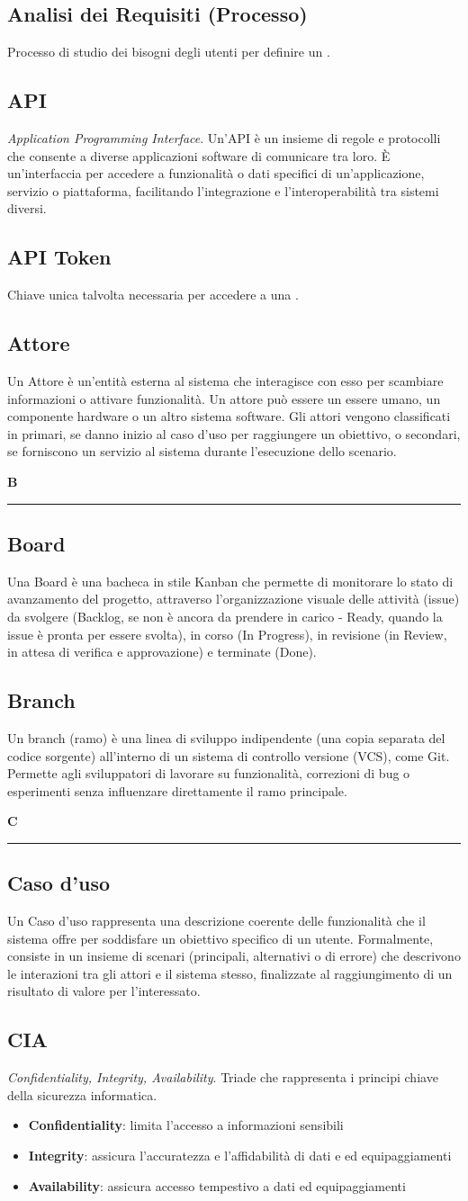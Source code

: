 \documentclass[a4paper, 11pt]{article}
\newcommand{\GlossarioLettera}[1]{%
    \clearpage
    \begin{center}
        {\LARGE \sffamily \color{AccentColor}\bfseries #1}
    \end{center}
    \addcontentsline{toc}{section}{#1}
    \textcolor{AccentColor}{\rule{\textwidth}{0.4pt}}
}
\newcommand{\nocontentsline}[3]{}
\newcommand{\term}[1]{\vspace*{.5cm}\bgroup\let\addcontentsline=\nocontentsline\subsection{#1}\label{term:#1}\egroup}
\newcommand{\refterm}[1]{\nameref{term:#1}}
\begin{document}
\term{Analisi dei Requisiti (Processo)}
Processo di studio dei bisogni degli utenti per definire un \refterm{Requisito}.

\term{API}
\textit{Application Programming Interface}. Un'API è un insieme di regole e protocolli che consente a diverse applicazioni software di comunicare tra loro. È un'interfaccia per accedere a funzionalità o dati specifici di un'applicazione, servizio o piattaforma, facilitando l'integrazione e l'interoperabilità tra sistemi diversi.

\term{API Token}
Chiave unica talvolta necessaria per accedere a una \refterm{API}.

\term{Attore}
Un Attore è un'entità esterna al sistema che interagisce con esso per scambiare informazioni o attivare funzionalità. Un attore può essere un essere umano, un componente hardware o un altro sistema software. Gli attori vengono classificati in primari, se danno inizio al caso d'uso per raggiungere un obiettivo, o secondari, se forniscono un servizio al sistema durante l'esecuzione dello scenario.


\GlossarioLettera{B}
\term{Board}
Una Board è una bacheca in stile Kanban che permette di monitorare lo stato di avanzamento del progetto, attraverso l'organizzazione visuale delle attività (issue) da svolgere (Backlog, se non è ancora da prendere in carico - Ready, quando la issue è pronta per essere svolta), in corso (In Progress), in revisione (in Review, in attesa di verifica e approvazione) e terminate (Done).

\term{Branch}
Un branch (ramo) è una linea di sviluppo indipendente (una copia separata del codice sorgente) all'interno di un sistema di controllo versione (VCS), come Git. Permette agli sviluppatori di lavorare su funzionalità, correzioni di bug o esperimenti senza influenzare direttamente il ramo principale.

\GlossarioLettera{C}
\term{Caso d'uso}
Un Caso d'uso rappresenta una descrizione coerente delle funzionalità che il sistema offre per soddisfare un obiettivo specifico di un utente. Formalmente, consiste in un insieme di scenari (principali, alternativi o di errore) che descrivono le interazioni tra gli attori e il sistema stesso, finalizzate al raggiungimento di un risultato di valore per l'interessato.

\term{CIA}
\textit{Confidentiality, Integrity, Availability}. Triade che rappresenta i principi chiave della sicurezza informatica.
\begin{itemize}
	\item \textbf{Confidentiality}: limita l'accesso a informazioni sensibili
	\item \textbf{Integrity}: assicura l'accuratezza e l'affidabilità di dati e ed equipaggiamenti
	\item \textbf{Availability}: assicura accesso tempestivo a dati ed equipaggiamenti
\end{itemize}
\end{document}
